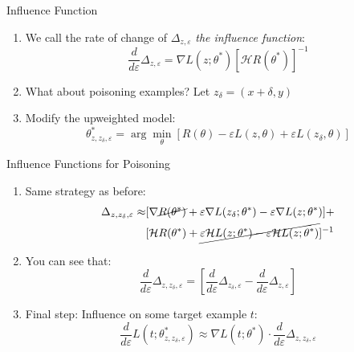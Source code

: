 \documentclass[10pt]{beamer}
\newcommand{\hessian}{\mathcal{H}\xspace}
\begin{document}
\begin{frame}[fragile]{Influence Function}

  \begin{enumerate}[<+-| alert@+>]
    \item We call the rate of change of $\Delta_{z, \varepsilon}$ \emph{the influence function}:
      \[
        \frac{d}{d\varepsilon} \Delta_{z, \varepsilon} = \nabla L(z; \theta^*) [\hessian R(\theta^*)]^{-1}
      \]
    \item What about poisoning examples? Let $z_\delta = (x + \delta, y)$
    \item Modify the upweighted model:
      \[
        \theta^*_{z, z_\delta, \varepsilon} = \arg \min_{\theta} [R(\theta) - \varepsilon L(z, \theta) +
        \varepsilon L(z_\delta, \theta)]
      \]
  \end{enumerate}

  \pause


\end{frame}


\begin{frame}[fragile]{Influence Functions for Poisoning}
  \begin{enumerate}[<+-| alert@+>]
    \item Same strategy as before:
      \[
        \begin{aligned}
          \Delta_{z, z_\delta, \varepsilon} \approx & [\nabla \cancel{R(\theta^*)} + \varepsilon \nabla L(z_\delta; \theta^*) - \varepsilon
          \nabla L(z; \theta^*)] + \\
          & [\hessian R(\theta^*) + \cancel{\varepsilon \hessian L(z; \theta^*) - \varepsilon
          \hessian L(z; \theta^*)}]^{-1}
        \end{aligned}
      \]
    \item You can see that:
      \[
        \frac{d}{d\varepsilon} \Delta_{z, z_\delta, \varepsilon} = \left[\frac{d}{d\varepsilon}
        \Delta_{z_\delta, \varepsilon} - \frac{d}{d\varepsilon} \Delta_{z, \varepsilon}\right]
      \]
    \item Final step: Influence on some target example $t$:
      \[
        \frac{d}{d\varepsilon} L(t; \theta^*_{z, z_\delta, \varepsilon}) \approx
        \nabla L(t; \theta^*) \cdot \frac{d}{d\varepsilon} \Delta_{z, z_\delta, \varepsilon}
      \]

  \end{enumerate}

  \pause

\end{frame}
\end{document}
